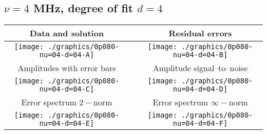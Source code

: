 

% 

\clearpage{}
\break{}

\subsection{$\nu = 4$ MHz, degree of fit $d = 4$}

\begin{table}[h]
    \begin{center}
        \begin{tabular}{ccc}
            Data and solution & \quad & Residual errors \\\hline
            \texttt{[image: ./graphics/0p080-nu=04-d=04-A]} &&
            \texttt{[image: ./graphics/0p080-nu=04-d=04-B]} \\[15pt]
            Amplitudes with error bars && Amplitude signal--to--noise \\\hline
            \texttt{[image: ./graphics/0p080-nu=04-d=04-C]} &&
            \texttt{[image: ./graphics/0p080-nu=04-d=04-D]} \\[15pt]
            Error spectrum $2-$norm && Error spectrum $\infty-$norm \\\hline
            \texttt{[image: ./graphics/0p080-nu=04-d=04-E]} &&
            \texttt{[image: ./graphics/0p080-nu=04-d=04-F]} \\[15pt]
        \end{tabular}
    \end{center}
\label{fig:elev=80, nu=4}
\end{table}



\endinput
